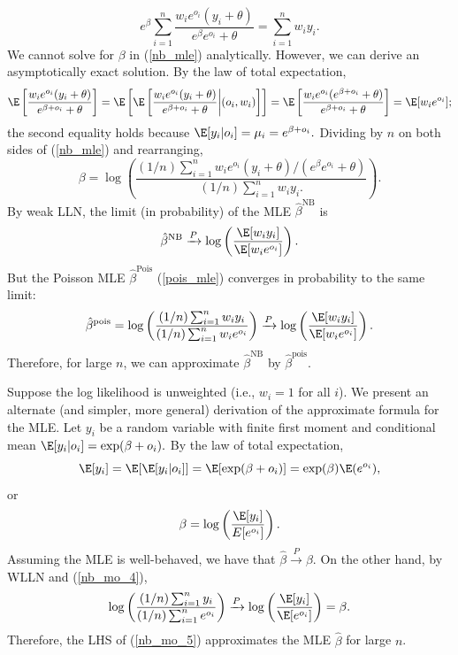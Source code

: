 \documentclass[11pt]{article}
\begin{document}
\begin{appendices}
\begin{refsection}
\begin{equation}
e^\beta \sum_{i=1}^n \frac{w_i e^{o_i} (y_i + \theta)}{e^\beta e^{o_i} + \theta} = \sum_{i=1}^n w_i y_i.
\end{equation}
We cannot solve for $\beta$ in (\ref{nb_mle}) analytically. However, we can derive an asymptotically exact solution. By the law of total expectation,
$$ \E \left[\frac{w_i  e^{o_i} (y_i + \theta)}{e^{\beta + o_i} + \theta} \right] = \E \left[\E\left[\frac{w_i e^{o_i} (y_i + \theta) }{e^{\beta + o_i} + \theta} \bigg| (o_i, w_i) \right] \right] = \E \left[\frac{w_i e^{o_i} (e^{\beta + o_i} + \theta)}{ e^{\beta + o_i} + \theta} \right] = \E [w_i e^{o_i}];
$$
the second equality holds because $\E[y_i | o_i ] = \mu_i = e^{\beta + o_i}.$ Dividing by $n$ on both sides of (\ref{nb_mle}) and rearranging,
\begin{equation}\label{nb_mo_3}
\beta = \log\left( \frac{ (1/n) \sum_{i=1}^n w_i e^{o_i} (y_i + \theta)/(e^\beta e^{o_i} + \theta)}{ (1/n) \sum_{i=1}^n w_i y_i. } \right).
\end{equation}
By weak LLN, the limit (in probability) of the MLE $\hat{\beta}^\textrm{NB}$ is
\begin{equation}
\hat{\beta}^{\textrm{NB}} \xrightarrow{P} \log\left(\frac{\E[w_i y_i]}{\E[w_i e^{o_i}]} \right).
\end{equation}
But the Poisson MLE $\hat{\beta}^{\textrm{Pois}}$ (\ref{pois_mle}) converges in probability to the same limit:
$$ \hat{\beta}^{\textrm{pois}} =  \log \left(\frac{ (1/n) \sum_{i=1}^n w_i y_i}{(1/n)\sum_{i=1}^n w_i e^{o_i}} \right) \xrightarrow{P} \log \left(\frac{\E[w_i y_i]}{ \E[w_i e^{o_i}]} \right).$$ Therefore, for large $n$, we can approximate $\hat{\beta}^{\textrm{NB}}$ by $\hat{\beta}^{\textrm{pois}}$.

Suppose the log likelihood is unweighted (i.e., $w_i = 1$ for all $i$). We present an alternate (and simpler, more general) derivation of the approximate formula for the MLE. Let $y_i$ be a random variable with finite first moment and conditional mean $\E[y_i | o_i] = \exp(\beta + o_i).$ By the law of total expectation,
$$ \E[y_i] = \E[\E[ y_i | o_i]] = \E[\exp(\beta + o_i)] = \exp(\beta) \E(e^{o_i}),$$ or
\begin{equation}\label{nb_mo_4}
\beta = \log\left(\frac{\E[y_i]}{E[e^{o_i}]} \right).
\end{equation}
Assuming the MLE is well-behaved, we have that $\hat{\beta} \xrightarrow{P} \beta.$ On the other hand, by WLLN and (\ref{nb_mo_4}),
\begin{equation}\label{nb_mo_5}
\log\left( \frac{(1/n) \sum_{i=1}^n y_i }{(1/n) \sum_{i=1}^n e^{o_i}} \right) \xrightarrow{P}  \log\left(\frac{ \E[y_i] }{ \E[e^{o_i}] } \right) = \beta.
\end{equation}
 Therefore, the LHS of (\ref{nb_mo_5}) approximates the MLE $\hat{\beta}$ for large $n$.


\end{refsection}
\end{appendices}
\end{document}
